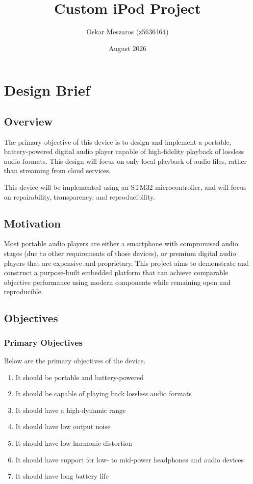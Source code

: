 \documentclass{article}
\title{Custom iPod Project}
\author{Oskar Meszaros (z5636164)}
\date{August 2026}
\begin{document}
\maketitle
\section{Design Brief}
\subsection{Overview}
The primary objective of this device is to design and implement a portable, battery-powered digital audio player capable of high-fidelity playback of lossless audio formats. This design will focus on only local playback of audio files, rather than streaming from cloud services.

This device will be implemented using an STM32 microcontroller, and will focus on repairability, transparency, and reproducibility.

\subsection{Motivation}
Most portable audio players are either a smartphone with compromised audio stages (due to other requirements of those devices), or premium digital audio players that are expensive and proprietary. This project aims to demonstrate and construct a purpose-built embedded platform that can achieve comparable objective performance using modern components while remaining open and reproducible.

\subsection{Objectives}
\subsubsection{Primary Objectives}
Below are the primary objectives of the device.
\begin{enumerate}
    \item It should be portable and battery-powered
    \item It should be capable of playing back lossless audio formats
    \item It should have a high-dynamic range
    \item It should have low output noise
    \item It should have low harmonic distortion
    \item It should have support for low- to mid-power headphones and audio devices
    \item It should have long battery life
\end{enumerate}
\end{document}
